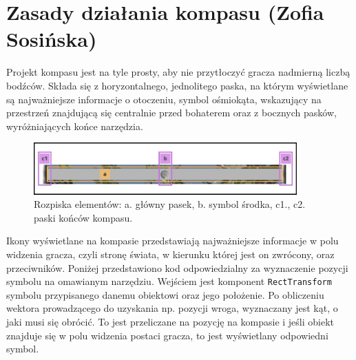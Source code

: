 \section{Zasady działania kompasu (Zofia Sosińska)}\label{chap:naw_impl}

Projekt kompasu jest na tyle prosty, aby nie przytłoczyć gracza nadmierną liczbą bodźców. Składa się z horyzontalnego, jednolitego paska,
na którym wyświetlane są najważniejsze informacje o otoczeniu, symbol ośmiokąta, wskazujący na przestrzeń znajdującą się centralnie przed bohaterem
oraz z bocznych pasków, wyróżniających końce narzędzia.

\begin{figure}[htbp]
    \centering
    \includegraphics[width=0.9\textwidth]{images/ui/opis_ekementow_kompasu.png}
    \caption{Rozpiska elementów: a. główny pasek, b. symbol środka, c1., c2. paski końców kompasu.}\label{fig:compass_design}
\end{figure}
\FloatBarrier
Ikony wyświetlane na kompasie przedstawiają najważniejsze informacje w polu widzenia gracza, czyli stronę świata, w kierunku której jest on zwrócony, oraz przeciwników.
Poniżej przedstawiono kod odpowiedzialny za wyznaczenie pozycji symbolu na omawianym narzędziu. Wejściem jest komponent \texttt{RectTransform} symbolu przypisanego
danemu obiektowi oraz jego położenie. Po obliczeniu wektora prowadzącego do uzyskania np. pozycji wroga, wyznaczany jest kąt, o jaki musi się obrócić.
To jest przeliczane na pozycję na kompasie i jeśli obiekt znajduje się w polu widzenia postaci gracza, to jest wyświetlany odpowiedni symbol.

